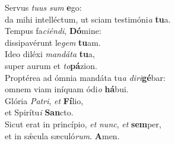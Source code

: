 \oddverse Servus \textit{tu}\textit{us} \textit{sum} \textbf{e}go:~\*\\
\oddverse da mihi intelléctum, ut sciam testimóni\textit{a} \textbf{tu}a.\\
\evenverse Tempus fa\textit{ci}\textit{én}\textit{di}, \textbf{Dó}mine:~\*\\
\evenverse dissipavérunt le\textit{gem} \textbf{tu}am.\\
\oddverse Ideo diléxi \textit{man}\textit{dá}\textit{ta} \textbf{tu}a,~\*\\
\oddverse super aurum et \textit{to}\textbf{pá}zion.\\
\evenverse Proptérea ad ómnia mandáta tu\textit{a} \textit{di}\textit{ri}\textbf{gé}bar:~\*\\
\evenverse omnem viam iníquam ódi\textit{o} \textbf{há}bui.\\
\oddverse Glória \textit{Pa}\textit{tri}, \textit{et} \textbf{Fí}lio,~\*\\
\oddverse et Spirítu\textit{i} \textbf{San}cto.\\
\evenverse Sicut erat in princípio, \textit{et} \textit{nunc}, \textit{et} \textbf{sem}per,~\*\\
\evenverse et in sǽcula sæculó\textit{rum}. \textbf{A}men.\\
